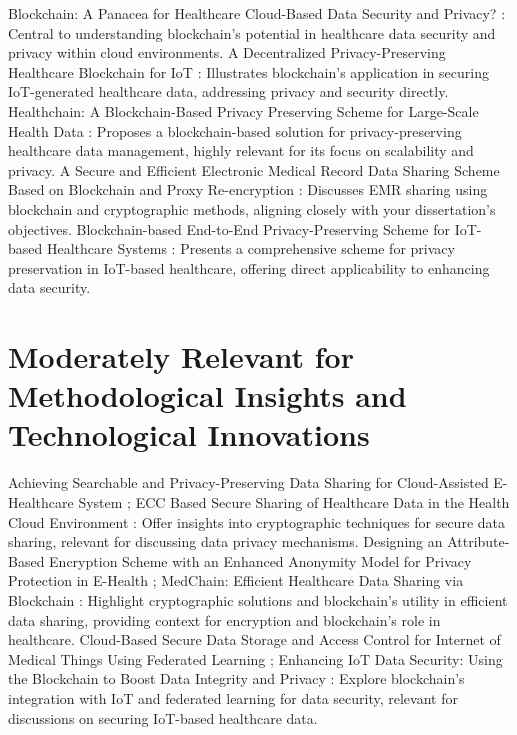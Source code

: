 \documentclass[cic,tc,english]{iiufrgs}
\begin{document}
    Blockchain: A Panacea for Healthcare Cloud-Based Data Security and Privacy? \cite{Esposito2018}: Central to understanding blockchain's potential in healthcare data security and privacy within cloud environments.
    A Decentralized Privacy-Preserving Healthcare Blockchain for IoT \cite{Dwivedi2019}: Illustrates blockchain's application in securing IoT-generated healthcare data, addressing privacy and security directly.
    Healthchain: A Blockchain-Based Privacy Preserving Scheme for Large-Scale Health Data \cite{XuJie2019}: Proposes a blockchain-based solution for privacy-preserving healthcare data management, highly relevant for its focus on scalability and privacy.
    A Secure and Efficient Electronic Medical Record Data Sharing Scheme Based on Blockchain and Proxy Re-encryption \cite{Liu2024}: Discusses EMR sharing using blockchain and cryptographic methods, aligning closely with your dissertation’s objectives.
    Blockchain-based End-to-End Privacy-Preserving Scheme for IoT-based Healthcare Systems \cite{maryam2024}: Presents a comprehensive scheme for privacy preservation in IoT-based healthcare, offering direct applicability to enhancing data security.

\section{Moderately Relevant for Methodological Insights and Technological Innovations}

    Achieving Searchable and Privacy-Preserving Data Sharing for Cloud-Assisted E-Healthcare System \cite{XuChang2019}; ECC Based Secure Sharing of Healthcare Data in the Health Cloud Environment \cite{sri2019}: Offer insights into cryptographic techniques for secure data sharing, relevant for discussing data privacy mechanisms.
    Designing an Attribute-Based Encryption Scheme with an Enhanced Anonymity Model for Privacy Protection in E-Health \cite{Zala2024}; MedChain: Efficient Healthcare Data Sharing via Blockchain \cite{Shen2019}: Highlight cryptographic solutions and blockchain’s utility in efficient data sharing, providing context for encryption and blockchain's role in healthcare.
    Cloud-Based Secure Data Storage and Access Control for Internet of Medical Things Using Federated Learning \cite{Bhansali2022}; Enhancing IoT Data Security: Using the Blockchain to Boost Data Integrity and Privacy \cite{Eghmazi2024}: Explore blockchain's integration with IoT and federated learning for data security, relevant for discussions on securing IoT-based healthcare data.
\end{document}

